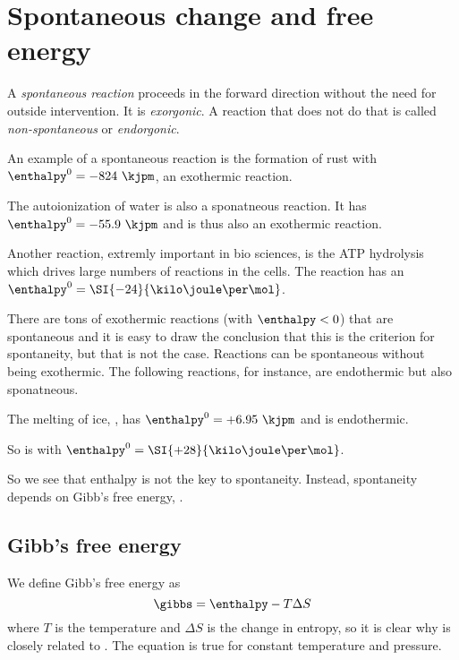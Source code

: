 \documentclass[../mit-general-chemistry.tex]{subfiles}
\begin{document}
\chapter{Spontaneous change and free energy}



A {\em spontaneous reaction} proceeds in the forward direction without
the need for outside intervention. It is {\em exorgonic}. A reaction
that does not do that is called {\em non-spontaneous} or {\em
  endorgonic}.

An example of a spontaneous reaction is the formation of rust
 with $\enthalpy^0 =
-824~\kjpm$, an exothermic reaction.


The autoionization of water  is
also a sponatneous reaction. It has $\enthalpy^0 = -55.9~\kjpm$ and is
thus also an exothermic reaction.

Another reaction, extremly important in bio sciences, is the ATP
hydrolysis  which drives large numbers of reactions in the cells. The
reaction has an $\enthalpy^0 = \SI{-24}{\kilo\joule\per\mol}$.

There are tons of exothermic reactions (with $\enthalpy < 0$) that are
spontaneous and it is easy to draw the conclusion that this is the
criterion for spontaneity, but that is not the case. Reactions can be
spontaneous without being exothermic. The following reactions, for
instance, are endothermic but also sponatneous.

The melting of ice, , has $\enthalpy^0 =
+6.95~\kjpm$ and is endothermic.

So is  with $\enthalpy^0 =
\SI{+28}{\kilo\joule\per\mol}$.

So we see that enthalpy is not the key to spontaneity. Instead,
spontaneity depends on Gibb's free energy, \gibbs.





\section{Gibb's free energy}



We define Gibb's free energy as
\begin{equation}\label{eq:gibbs}
  \gibbs = \enthalpy - T \Delta S
\end{equation}
where $T$ is the temperature and $\Delta S$ is the change in entropy,
so it is clear why \enthalpy is closely related to \gibbs. The
equation is true for constant temperature and pressure.
\end{document}
